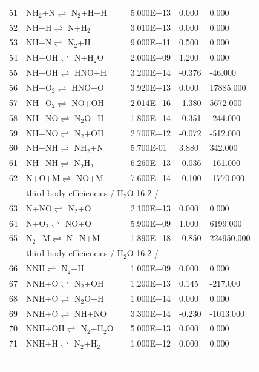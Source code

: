 \documentclass[11pt]{article}
\begin{document}
\begin{table}[hbt]
\begin{tabular}{|r l c l l l|}
51 &	NH$_{2}$+N$\rightleftharpoons$ N$_{2}$+H+H&	&	5.000E+13&	0.000&	0.000\\ 
52 &	NH+H$\rightleftharpoons$ N+H$_{2}$&	&	3.010E+13&	0.000&	0.000\\ 
53 &	NH+N$\rightleftharpoons$ N$_{2}$+H&	&	9.000E+11&	0.500&	0.000\\ 
54 &	NH+OH$\rightleftharpoons$ N+H$_{2}$O&	&	2.000E+09&	1.200&	0.000\\ 
55 &	NH+OH$\rightleftharpoons$ HNO+H&	&	3.200E+14&	-0.376&	-46.000\\ 
56 &	NH+O$_{2}$$\rightleftharpoons$ HNO+O&	&	3.920E+13&	0.000&	17885.000\\ 
57 &	NH+O$_{2}$$\rightleftharpoons$ NO+OH&	&	2.014E+16&	-1.380&	5672.000\\ 
58 &	NH+NO$\rightleftharpoons$ N$_{2}$O+H&	&	1.800E+14&	-0.351&	-244.000\\ 
59 &	NH+NO$\rightleftharpoons$ N$_{2}$+OH&	&	2.700E+12&	-0.072&	-512.000\\ 
60 &	NH+NH$\rightleftharpoons$ NH$_{2}$+N&	&	5.700E-01&	3.880&	342.000\\ 
61 &	NH+NH$\rightleftharpoons$ N$_{2}$H$_{2}$&	&	6.260E+13&	-0.036&	-161.000\\ 
62 &	N+O+M$\rightleftharpoons$ NO+M&	&	7.600E+14&	-0.100&	-1770.000\\ 
	&\multicolumn{5}{l|}{third-body efficiencies  / H$_{2}$O 16.2 /}\\ 
63 &	N+NO$\rightleftharpoons$ N$_{2}$+O&	&	2.100E+13&	0.000&	0.000\\ 
64 &	N+O$_{2}$$\rightleftharpoons$ NO+O&	&	5.900E+09&	1.000&	6199.000\\ 
65 &	N$_{2}$+M$\rightleftharpoons$ N+N+M&	&	1.890E+18&	-0.850&	224950.000\\ 
	&\multicolumn{5}{l|}{third-body efficiencies  / H$_{2}$O 16.2 /}\\ 
66 &	NNH$\rightleftharpoons$ N$_{2}$+H&	&	1.000E+09&	0.000&	0.000\\ 
67 &	NNH+O$\rightleftharpoons$ N$_{2}$+OH&	&	1.200E+13&	0.145&	-217.000\\ 
68 &	NNH+O$\rightleftharpoons$ N$_{2}$O+H&	&	1.000E+14&	0.000&	0.000\\ 
69 &	NNH+O$\rightleftharpoons$ NH+NO&	&	3.300E+14&	-0.230&	-1013.000\\ 
70 &	NNH+OH$\rightleftharpoons$ N$_{2}$+H$_{2}$O&	&	5.000E+13&	0.000&	0.000\\ 
71 &	NNH+H$\rightleftharpoons$ N$_{2}$+H$_{2}$&	&	1.000E+12&	0.000&	0.000\\ 
$$
\end{tabular}
\end{table}
\end{document}
